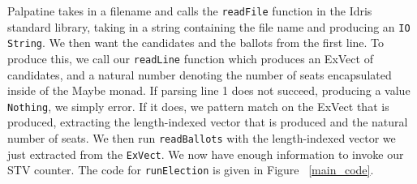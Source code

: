 Palpatine takes in a filename and calls the \texttt{readFile} function in the
Idris standard library, taking in a string containing the file name and
producing an \texttt{IO String}. We then want the candidates and the ballots
from the first line. To produce this, we call our \texttt{readLine} function
which produces an ExVect of candidates, and a natural number denoting the number
of seats encapsulated inside of the Maybe monad. If parsing line 1 does not
succeed, producing a value \texttt{Nothing}, we simply error. If it does, we
pattern match on the ExVect that is produced, extracting the length-indexed
vector that is produced and the natural number of seats. We then run
\texttt{readBallots} with the length-indexed vector we just extracted from the
\texttt{ExVect}. We now have enough information to invoke our STV counter. The
code for \texttt{runElection} is given in Figure ~\ref{main_code}. 